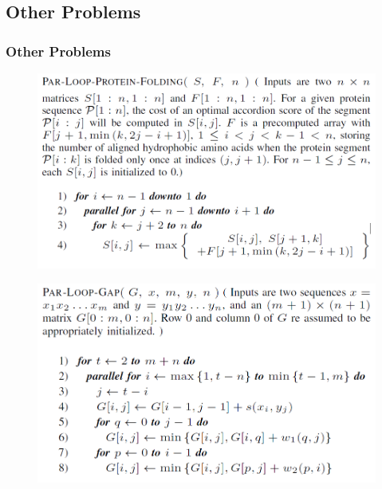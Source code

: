 \subsection{Other Problems}
\begin{frame}
    \frametitle{Other Problems}
    \begin{figure}
		\includegraphics[scale=0.2]{figure/fig-folding.png}
	\end{figure}
	\begin{figure}
		\includegraphics[scale=0.2]{figure/fig-gap.png}
	\end{figure}
\end{frame}

